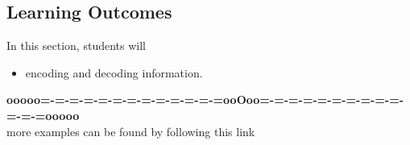 \documentclass{ximera}
\begin{document}
\subsection{Learning Outcomes}


\begin{sectionOutcomes}
In this section, students will 

\begin{itemize}
\item encoding and decoding information.
\end{itemize}
\end{sectionOutcomes}









\begin{center}
\textbf{\textcolor{green!50!black}{ooooo=-=-=-=-=-=-=-=-=-=-=-=-=ooOoo=-=-=-=-=-=-=-=-=-=-=-=-=ooooo}} \\

more examples can be found by following this link\\ 

\end{center}
\end{document}
